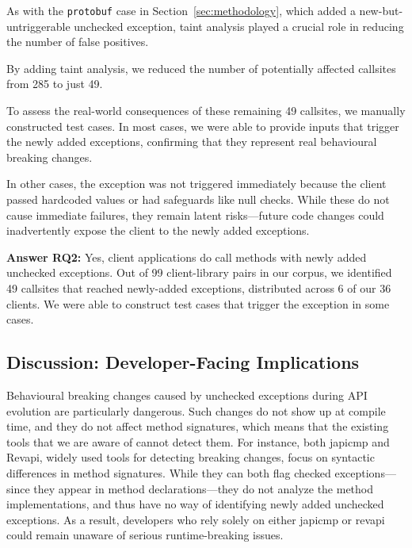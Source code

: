 As with the \texttt{protobuf} case in Section~\ref{sec:methodology}, which added a new-but-untriggerable unchecked exception, taint analysis played a crucial role in reducing the number of false positives.

\vspace{1em}
\begin{tcolorbox}[colback=gray!10, colframe=black]
By adding taint analysis, we reduced the number of potentially affected callsites from 285 to just 49.
\end{tcolorbox}
\vspace{1em}

To assess the real-world consequences of these remaining 49 callsites, we manually constructed test cases. In most cases, we were able to provide inputs that trigger the newly added exceptions, confirming that they represent real behavioural breaking changes.

In other cases, the exception was not triggered immediately because the client passed hardcoded values or had safeguards like null checks. While these do not cause immediate failures, they remain latent risks—future code changes could inadvertently expose the client to the newly added exceptions.

\vspace{1em}
\begin{tcolorbox}[colback=gray!10, colframe=black]
\textbf{Answer RQ2:} Yes, client applications do call methods with newly added unchecked exceptions. Out of 99 client-library pairs in our corpus, we identified 49 callsites that reached newly-added exceptions, distributed across 6 of our 36 clients. We were able to construct test cases that trigger the exception in some cases.
\end{tcolorbox}
\vspace{1em}

\subsection{Discussion: Developer-Facing Implications}

Behavioural breaking changes caused by unchecked exceptions during API evolution are particularly dangerous. Such changes do not show up at compile time, and they do not affect method signatures, which means that the existing tools that we are aware of cannot detect them. For instance, both japicmp and Revapi, widely used tools for detecting breaking changes, focus on syntactic differences in method signatures. While they can both flag checked exceptions—since they appear in method declarations—they do not analyze the method implementations, and thus have no way of identifying newly added unchecked exceptions. As a result, developers who rely solely on either japicmp or revapi could remain unaware of serious runtime-breaking issues.

